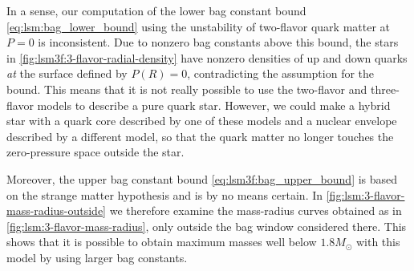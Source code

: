 In a sense, our computation of the lower bag constant bound \eqref{eq:lsm:bag_lower_bound} using the unstability of two-flavor quark matter at $P=0$ is inconsistent.
Due to nonzero bag constants above this bound, the stars in \cref{fig:lsm3f:3-flavor-radial-density} have nonzero densities of up and down quarks \emph{at} the surface defined by $P(R)=0$, contradicting the assumption for the bound.
This means that it is not really possible to use the two-flavor and three-flavor models to describe a pure quark star.
However, we could make a hybrid star with a quark core described by one of these models and a nuclear envelope described by a different model, so that the quark matter no longer touches the zero-pressure space outside the star.

Moreover, the upper bag constant bound \eqref{eq:lsm3f:bag_upper_bound} is based on the strange matter hypothesis and is by no means certain.
In \cref{fig:lsm:3-flavor-mass-radius-outside} we therefore examine the mass-radius curves obtained as in \cref{fig:lsm:3-flavor-mass-radius}, only outside the bag window considered there.
This shows that it is possible to obtain maximum masses well below $1.8 M_\odot$ with this model by using larger bag constants.






